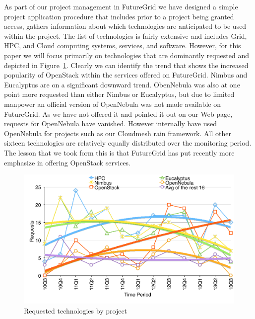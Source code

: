 \documentclass[graybox]{svmult}
\begin{document}
As part of our project management in FutureGrid we have designed a simple project application procedure that includes prior to a project being granted access, gathers information about which technologies are anticipated to be used within the project. The list of technologies is fairly extensive and includes Grid, HPC, and Cloud computing systems, services, and software. However, for this paper we will focus primarily on technologies that are dominantly requested and depicted in Figure~\ref{F:request-tech}. Clearly we can identify the trend that shows the increased popularity of OpenStack within the services offered on FutureGrid. Nimbus and Eucalyptus are on a significant downward trend. ObenNebula was also at one point more requested than either Nimbus or Eucalyptus, but due to limited manpower an official version of OpenNebula was not made available on FutureGrid. As we have not offered it and pointed it out on our Web page, requests for OpenNebula have vanished.  However internally have used OpenNebula for projects such as our Cloudmesh rain framework. All other sixteen technologies are relatively equally distributed over the monitoring period. The lesson that we took form this is that FutureGrid has put recently more emphasize in offering OpenStack services.



\begin{figure}[htb]
  \centering
    \includegraphics[width=1.0\textwidth]{images/trend-a.pdf}
  \caption{Requested technologies by project}\label{F:request-tech}
\end{figure}
\end{document}
